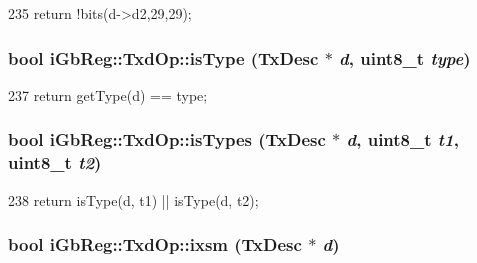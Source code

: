 \begin{DoxyCode}
235 { return !bits(d->d2,29,29); }
\end{DoxyCode}
\hypertarget{namespaceiGbReg_1_1TxdOp_aa03874ccb0b42e0cc137487bd84279d4}{
\subsubsection[{isType}]{\setlength{\rightskip}{0pt plus 5cm}bool iGbReg::TxdOp::isType (TxDesc $\ast$ {\em d}, \/  uint8\_\-t {\em type})}}
\label{namespaceiGbReg_1_1TxdOp_aa03874ccb0b42e0cc137487bd84279d4}



\begin{DoxyCode}
237 { return getType(d) == type; }
\end{DoxyCode}
\hypertarget{namespaceiGbReg_1_1TxdOp_a0e959a47b95acd45e14d16adab0add82}{
\subsubsection[{isTypes}]{\setlength{\rightskip}{0pt plus 5cm}bool iGbReg::TxdOp::isTypes (TxDesc $\ast$ {\em d}, \/  uint8\_\-t {\em t1}, \/  uint8\_\-t {\em t2})}}
\label{namespaceiGbReg_1_1TxdOp_a0e959a47b95acd45e14d16adab0add82}



\begin{DoxyCode}
238 { return isType(d, t1) || isType(d, t2); }
\end{DoxyCode}
\hypertarget{namespaceiGbReg_1_1TxdOp_ad3912371dfd0afe6467b8612bb0c040e}{
\subsubsection[{ixsm}]{\setlength{\rightskip}{0pt plus 5cm}bool iGbReg::TxdOp::ixsm (TxDesc $\ast$ {\em d})}}
\label{namespaceiGbReg_1_1TxdOp_ad3912371dfd0afe6467b8612bb0c040e}



